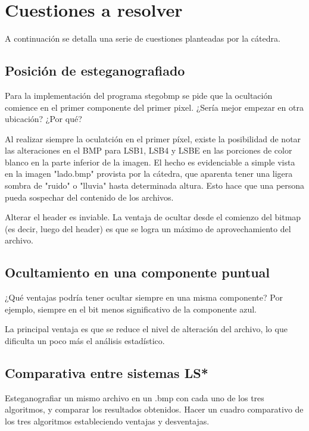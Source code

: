\section{Cuestiones a resolver}
A continuación se detalla una serie de cuestiones planteadas por la cátedra.

\subsection{Posición de esteganografiado}
\begin{displayquote}
Para la implementación del programa stegobmp se pide que la ocultación comience en el
primer componente del primer pixel. ¿Sería mejor empezar en otra ubicación? ¿Por qué? 
\end{displayquote}

Al realizar siempre la oculatción en el primer píxel, existe la posibilidad de notar las alteraciones en el BMP para LSB1, LSB4 y LSBE en las porciones de color blanco en la parte inferior de la imagen. El hecho es evidenciable a simple vista en la imagen "lado.bmp" provista por la cátedra, que aparenta tener una ligera sombra de "ruido" o "lluvia" hasta determinada altura. Esto hace que una persona pueda sospechar del contenido de los archivos.

Alterar el header es inviable. La ventaja de ocultar desde el comienzo del bitmap (es decir, luego del header) es que se logra un máximo de aprovechamiento del archivo.

\subsection{Ocultamiento en una componente puntual}
\begin{displayquote}
¿Qué ventajas podría tener ocultar siempre en una misma componente? Por ejemplo, siempre
en el bit menos significativo de la componente azul.
\end{displayquote}

La principal ventaja es que se reduce el nivel de alteración del archivo, lo que dificulta un poco más el análisis estadístico.

\subsection{Comparativa entre sistemas LS*}
\begin{displayquote}
Esteganografiar un mismo archivo en un .bmp con cada uno de los tres algoritmos, y comparar
los resultados obtenidos. Hacer un cuadro comparativo de los tres algoritmos estableciendo
ventajas y desventajas.
\end{displayquote}

